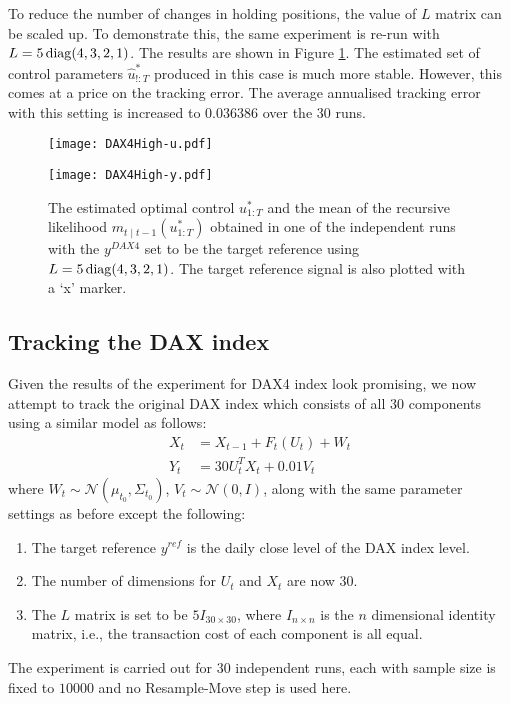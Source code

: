 To reduce the number of changes in holding positions, the value of $L$ matrix can be scaled up. To demonstrate this, the same experiment is re-run with $L = 5\operatorname{diag}(4,3,2,1)$. The results are shown in Figure \ref{fig:dax42}. The estimated set of control parameters $\hat{u}^*_{!:T}$ produced in this case is much more stable. However, this comes at a price on the tracking error. The average annualised tracking error with this setting is increased to $0.036386$ over the $30$ runs. 

\begin{figure}[htbp]
\centering
    \begin{minipage}{0.5\textwidth}
        \centering
        \texttt{[image: DAX4High-u.pdf]}
    \end{minipage}%
    \begin{minipage}{0.5\textwidth}
        \centering
        \texttt{[image: DAX4High-y.pdf]}
    \end{minipage}
\caption{The estimated optimal control $u^*_{1:T}$ and the mean of the recursive likelihood $m_{t \mid t-1}(u^*_{1:T})$ obtained in one of the independent runs with the $y^{DAX4}$ set to be the target reference using $L = 5\operatorname{diag}(4,3,2,1)$. The target reference signal is also plotted with a `x' marker.}
\label{fig:dax42}
\end{figure}

\subsection{Tracking the DAX index}
Given the results of the experiment for DAX4 index look promising, we now attempt to track the original DAX index which consists of all $30$ components using a similar model as follows:
\begin{align}
  X_t &= X_{t-1} + F_t(U_t) + W_t \\
  Y_t &= 30U^T_tX_t + 0.01V_t
\end{align}
where $W_t \sim \mathcal{N}(\mu_{t_0}, \Sigma_{t_0})$, $V_t \sim \mathcal{N}(0, I)$, along with the same parameter settings as before except the following:
\begin{enumerate}
\item The target reference $y^{ref}$ is the daily close level of the DAX index level.
\item The number of dimensions for $U_t$ and $X_t$ are now $30$.
\item The $L$ matrix is set to be $5I_{30 \times 30}$, where $I_{n \times n}$ is the $n$ dimensional identity matrix, i.e., the transaction cost of each component is all equal.
\end{enumerate}
The experiment is carried out for $30$ independent runs, each with sample size is fixed to $10000$ and no Resample-Move step is used here.

